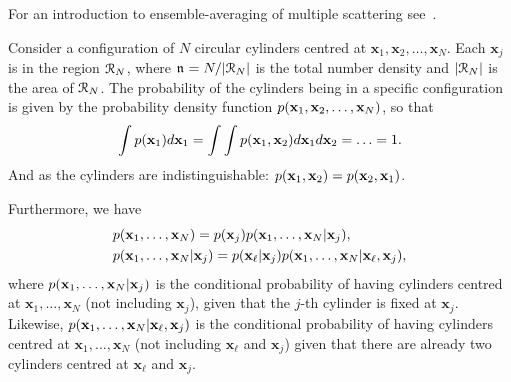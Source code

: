 \documentclass[ 12pt, a4paper]{article}
\begin{document}
For an introduction to ensemble-averaging of multiple scattering see~\cite{foldy_multiple_1945}.

Consider a configuration of $N$ circular cylinders centred at $\mathbf x_1,\mathbf x_2, \ldots, \mathbf x_N$. Each $\mathbf x_j$ is in the region $\mathcal R_N$, where $\mathfrak n_{} = N/|\mathcal R_N|$ is the total number density and $|\mathcal R_N|$ is the area of $\mathcal R_N$.
The probability of the cylinders being in a specific configuration is given by the probability density function $p(\mathbf x_1,\mathbf x_2,\ldots, \mathbf x_N)$, so that
\begin{equation}
\int p(\mathbf x_1) d \mathbf x_1 = \int \int p(\mathbf x_1, \mathbf x_2) d \mathbf x_1 d \mathbf x_2 = \ldots = 1.
\end{equation}
And as the cylinders are indistinguishable: $p(\mathbf x_1, \mathbf x_2) = p(\mathbf x_2, \mathbf x_1)$.

Furthermore, we have
\begin{align}
  &p(\mathbf x_1, \ldots, \mathbf x_N) = p(\mathbf x_j) p(\mathbf x_{1}, \ldots, \mathbf x_N|\mathbf x_j),
  \label{eqns:conditional_probj}
  \\
  &p(\mathbf x_1, \ldots, \mathbf x_N|\mathbf x_j) = p(\mathbf x_\ell |\mathbf x_j) p( \mathbf x_1, \ldots, \mathbf x_N|\mathbf x_\ell,\mathbf x_j),
  \label{eqns:conditional_probsj}
\end{align}
where $p(\mathbf x_{1}, \ldots, \mathbf x_N|\mathbf x_j)$ is the conditional probability of having cylinders centred at $\mathbf x_{1}, \ldots, \mathbf x_N$ (not including $\mathbf x_j$), given that the $j$-th cylinder is fixed at $\mathbf x_j$. Likewise, $p( \mathbf x_1, \ldots, \mathbf x_N| \mathbf x_{\ell},\mathbf x_{j})$ is the conditional probability of having cylinders centred at $\mathbf x_{1}, \ldots, \mathbf x_N$ (not including $\mathbf x_\ell$ and $\mathbf x_j$) given that there are already two cylinders centred at $\mathbf x_\ell$ and $\mathbf x_j$.
\end{document}
